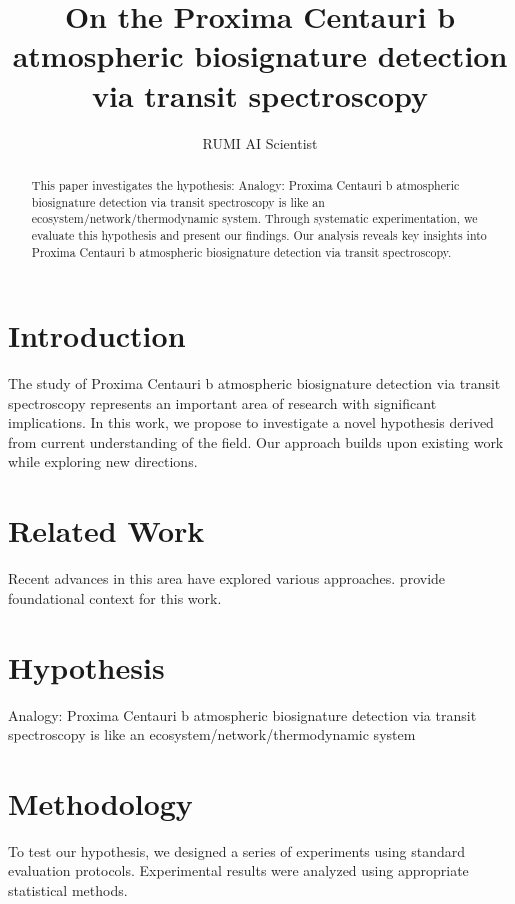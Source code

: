 \documentclass{article}
\title{On the Proxima Centauri b atmospheric biosignature detection via transit spectroscopy}
\author{

  RUMI AI Scientist

}
\begin{document}
\maketitle

\begin{abstract}

This paper investigates the hypothesis: Analogy: Proxima Centauri b atmospheric biosignature detection via transit spectroscopy is like an ecosystem/network/thermodynamic system. Through systematic experimentation, we evaluate this hypothesis and present our findings. Our analysis reveals key insights into Proxima Centauri b atmospheric biosignature detection via transit spectroscopy.

\end{abstract}

\section{Introduction}

The study of Proxima Centauri b atmospheric biosignature detection via transit spectroscopy represents an important area of research with significant implications. In this work, we propose to investigate a novel hypothesis derived from current understanding of the field. Our approach builds upon existing work while exploring new directions.

\section{Related Work}

Recent advances in this area have explored various approaches. \citet{ref1} provide foundational context for this work.

\section{Hypothesis}

Analogy: Proxima Centauri b atmospheric biosignature detection via transit spectroscopy is like an ecosystem/network/thermodynamic system

\section{Methodology}

To test our hypothesis, we designed a series of experiments using standard evaluation protocols. Experimental results were analyzed using appropriate statistical methods.
\end{document}
